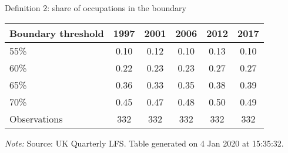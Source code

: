 \begin{center}
\begin{threeparttable}[!h]
\caption{Definition 2: share of occupations in the boundary}
\label{tab:shareBound}
\begin{tabular}{lccccc}
\toprule
\toprule
\textbf{Boundary threshold}&\multicolumn{1}{c}{\textbf{1997}}&\multicolumn{1}{c}{\textbf{2001}}&\multicolumn{1}{c}{\textbf{2006}}&\multicolumn{1}{c}{\textbf{2012}}&\multicolumn{1}{c}{\textbf{2017}} \\
\midrule
55\%        &        0.10&        0.12&        0.10&        0.13&        0.10\\
60\%        &        0.22&        0.23&        0.23&        0.27&        0.27\\
65\%        &        0.36&        0.33&        0.35&        0.38&        0.39\\
70\%        &        0.45&        0.47&        0.48&        0.50&        0.49\\
\midrule Observations&         332&         332&         332&         332&         332\\
\bottomrule
\bottomrule
\end{tabular}
\begin{tablenotes}
\item\footnotesize\textit{Note:} Source: UK Quarterly LFS. Table generated on  4 Jan 2020 at 15:35:32.
\end{tablenotes}
\end{threeparttable}
\end{center}
